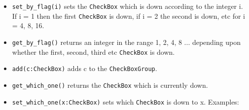 \begin{itemize}
\item\noindent\texttt{set\_by\_flag(i)} sets the  \texttt{CheckBox} which is down according to the
integer i. If i = 1 then the first  \texttt{CheckBox} is down, if i = 2 the
second is down, etc for i = 4, 8, 16.

\item\noindent\texttt{get\_by\_flag()} returns an integer in the range 1, 2, 4, 8 ...
depending upon whether the first, second, third etc  \texttt{CheckBox} is down.

\item\noindent\texttt{add(c:CheckBox)} adds c to the  \texttt{CheckBoxGroup}.

\item\noindent\texttt{get\_which\_one()} returns the  \texttt{CheckBox} which is currently down.

\item\noindent\texttt{set\_which\_one(x:CheckBox)} sets which  \texttt{CheckBox} is down to x. Examples:

\end{itemize}

